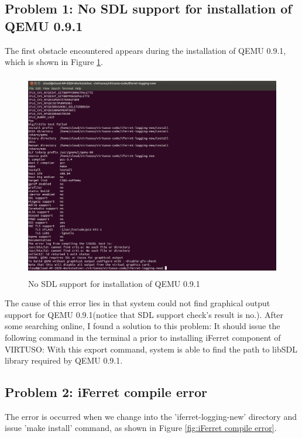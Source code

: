 \subsection{Problem 1: No SDL support for installation of QEMU 0.9.1}
The first obstacle encountered appears during the installation of QEMU 0.9.1, which is shown in Figure \ref{fig:No SDL support for installation of QEMU 0.9.1}.

\begin{figure}[htbp]
	\centering
		\includegraphics[width=14cm, height= 9cm ]{Figures/Figure32.png}
	\caption[No SDL support for installation of QEMU 0.9.1]{No SDL support for installation of QEMU 0.9.1}
	\label{fig:No SDL support for installation of QEMU 0.9.1}
\end{figure}

The cause of this error lies in that system could not find graphical output support for QEMU 0.9.1(notice that SDL support check's 
result is no.). After some searching online, I found a solution to this problem: It should issue the following command in the terminal a prior to installing iFerret component of VIRTUSO:
With this export command, system is able to find the path to libSDL library required by QEMU 0.9.1.


\subsection{Problem 2: iFerret compile error}
The error is occurred when we change into the 'iferret-logging-new' directory and issue 'make install' command, as shown in Figure \ref{fig:iFerret compile error}.

